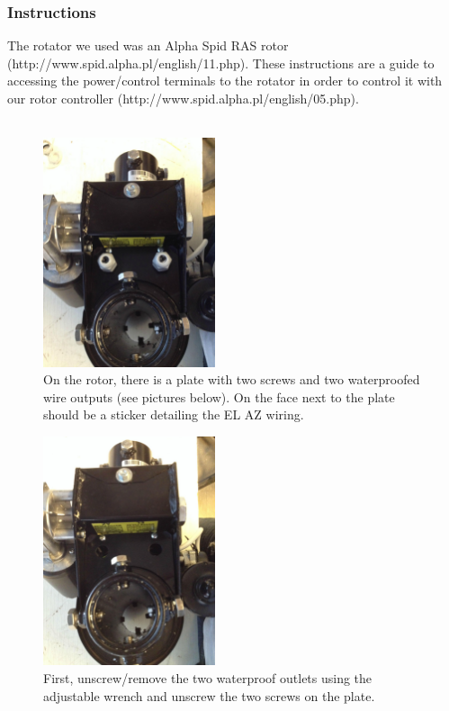 \documentclass[11pt]{article} %
\begin{document}
\subsubsection{Instructions}


The rotator we used was an Alpha Spid RAS rotor (http://www.spid.alpha.pl/english/11.php). These instructions are a guide to accessing the power/control terminals to the rotator in order to control it with our rotor controller (http://www.spid.alpha.pl/english/05.php). \\ \\


\begin{figure}
  \centering
  \caption{On the rotor, there is a plate with two screws and two waterproofed wire outputs (see pictures below). On the face next to the plate should be a sticker detailing the EL AZ wiring. }
  \includegraphics[width=0.45\textwidth]{wiring/01.jpeg}
\end{figure}


\begin{figure}
  \centering
  \caption{First, unscrew/remove the two waterproof outlets using the adjustable wrench and unscrew the two screws on the plate.}
  \includegraphics[width=0.45\textwidth]{wiring/02.jpeg}
\end{figure}
\end{document}
